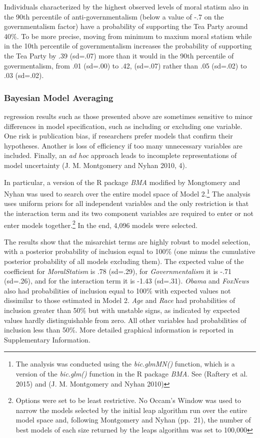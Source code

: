 \documentclass[12pt,]{article}
\begin{document}
Individuals characterized by the highest observed levels of moral
statism also in the 90th percentile of anti-governmentalism (below a
value of -.7 on the governmentalism factor) have a probability of
supporting the Tea Party around 40\%. To be more precise, moving from
minimum to maxium moral statism while in the 10th percentile of
governmentalism increases the probability of supporting the Tea Party by
.39 (sd=.07) more than it would in the 90th percentile of
govermentalism, from .01 (sd=.00) to .42, (sd=.07) rather than .05
(sd=.02) to .03 (sd=.02).

\clearpage

\subsubsection{Bayesian Model Averaging}\label{bayesian-model-averaging}

regression results such as those presented above are sometimes sensitive
to minor differences in model specification, such as including or
excluding one variable. One risk is publication bias, if researchers
prefer models that confirm their hypotheses. Another is loss of
efficiency if too many unnecessary variables are included. Finally, an
\emph{ad hoc} approach leads to incomplete representations of model
uncertainty (J. M. Montgomery and Nyhan 2010, 4).

In particular, a version of the R package \emph{BMA} modified by
Mongtomery and Nyhan was used to search over the entire model space of
Model 2.\footnote{The analysis was conducted using the
  \emph{bic.glmMN()} function, which is a version of the
  \emph{bic.glm()} function in the R package \emph{BMA}. See (Raftery et
  al. 2015) and (J. M. Montgomery and Nyhan 2010)} The analysis uses
uniform priors for all independent variables and the only restriction is
that the interaction term and its two component variables are required
to enter or not enter models together.\footnote{Options were set to be
  least restrictive. No Occam's Window was used to narrow the models
  selected by the initial leap algorithm run over the entire model space
  and, following Montgomery and Nyhan (pp.~21), the number of best
  models of each size returned by the leaps algorithm was set to 100,000}
In the end, 4,096 models were selected.

The results show that the misarchist terms are highly robust to model
selection, with a posterior probability of inclusion equal to 100\% (one
minus the cumulative posterior probability of all models excluding
them). The expected value of the coefficient for \emph{MoralStatism} is
.78 (sd=.29), for \emph{Governmentalism} it is -.71 (sd=.26), and for
the interaction term it is -1.43 (sd=.31). \emph{Obama} and
\emph{FoxNews} also had probabilities of inclusion equal to 100\% with
expected values not dissimilar to those estimated in Model 2. \emph{Age}
and \emph{Race} had probabilities of inclusion greater than 50\% but
with unstable signs, as indicated by expected values hardly
distinguishable from zero. All other variables had probabilities of
inclusion less than 50\%. More detailed graphical information is
reported in Supplementary Information.
\end{document}
